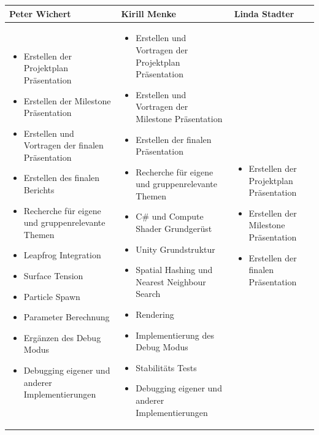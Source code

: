 \documentclass[a4paper]{paper}
\begin{document}
\begin{center}
\begin{tabularx}{\textwidth}{ 
		| >{\raggedright\arraybackslash}X 
		| >{\raggedright\arraybackslash}X 
		| >{\raggedright\arraybackslash}X | }
\hline
Peter Wichert & Kirill Menke & Linda Stadter\\
\hline \hline
\begin{itemize}
\item Erstellen der Projektplan Präsentation
\item Erstellen der Milestone Präsentation
\item Erstellen und Vortragen der finalen Präsentation
\item Erstellen des finalen Berichts
\item Recherche für eigene und gruppenrelevante Themen
\item Leapfrog Integration
\item Surface Tension
\item Particle Spawn
\item Parameter Berechnung
\item Ergänzen des Debug Modus
\item Debugging eigener und anderer Implementierungen
\end{itemize}
&
\begin{itemize}
\item Erstellen und Vortragen der Projektplan Präsentation
\item Erstellen und Vortragen der Milestone Präsentation
\item Erstellen der finalen Präsentation
\item Recherche für eigene und gruppenrelevante Themen
\item C\# und Compute Shader Grundgerüst
\item Unity Grundstruktur
\item Spatial Hashing und Nearest Neighbour Search
\item Rendering
\item Implementierung des Debug Modus
\item Stabilitäts Tests
\item Debugging eigener und anderer Implementierungen
\end{itemize}
&
\begin{itemize}
\item Erstellen der Projektplan Präsentation
\item Erstellen der Milestone Präsentation
\item Erstellen der finalen Präsentation

\end{itemize}
\end{tabularx}
\end{center}
\end{document}
